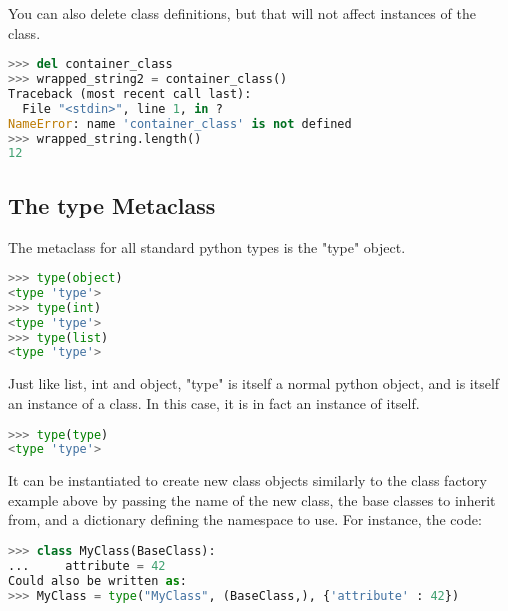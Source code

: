 You can also delete class definitions, but that will not affect instances of the
class.
\lstset{basicstyle=\scriptsize, numbers=left, captionpos=b, tabsize=4}
\begin{lstlisting}[caption=Container Class Deletion,language={Python},
xleftmargin=15pt, label=lst:containerclassdeletion]
>>> del container_class
>>> wrapped_string2 = container_class()
Traceback (most recent call last):
  File "<stdin>", line 1, in ?
NameError: name 'container_class' is not defined
>>> wrapped_string.length()
12
\end{lstlisting}

\subsection{The type Metaclass}
The metaclass for all standard python types is the "type" object.
\lstset{basicstyle=\scriptsize, numbers=left, captionpos=b, tabsize=4}
\begin{lstlisting}[caption=Meta Class,language={Python},
xleftmargin=15pt, label=lst:metaclass]
>>> type(object)
<type 'type'>
>>> type(int)
<type 'type'>
>>> type(list)
<type 'type'>
\end{lstlisting}

Just like list, int and object, "type" is itself a normal python object, and is
itself an instance of a class. In this case, it is in fact an instance of
itself.
\lstset{basicstyle=\scriptsize, numbers=left, captionpos=b, tabsize=4}
\begin{lstlisting}[caption=Type of Type,language={Python},
xleftmargin=15pt, label=lst:typeoftype]
>>> type(type)
<type 'type'>
\end{lstlisting}

It can be instantiated to create new class objects similarly to the class
factory example above by passing the name of the new class, the base classes to
inherit from, and a dictionary defining the namespace to use.  For instance, the
code:
\lstset{basicstyle=\scriptsize, numbers=left, captionpos=b, tabsize=4}
\begin{lstlisting}[caption=Meta Class Inheritance,language={Python},
xleftmargin=15pt, label=lst:metaclassinheritance]
>>> class MyClass(BaseClass):
...     attribute = 42
Could also be written as:
>>> MyClass = type("MyClass", (BaseClass,), {'attribute' : 42})
\end{lstlisting}

